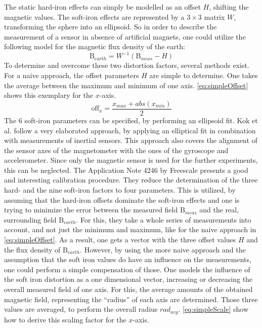 The static hard-iron effects can simply be modelled as an offset $ H $, shifting the magnetic values. The soft-iron effects are represented by a $ 3\times3 $ matrix $ W $, transforming the sphere into an ellipsoid. So in order to describe the measurement of a sensor in absence of artificial magnets, one could utilize the following model for the magnetic flux density of the earth:
\begin{equation} \label{eq:hardSoftModel}
\mathrm{B}_{earth} = W^{-1} (\mathrm{B}_{meas} - H)
\end{equation}
To determine and overcome these two distortion factors, several methods exist. For a naive approach, the offset parameters $ H $ are simple to determine. One takes the average between the maximum and minimum of one axis. \ref{eq:simpleOffset} shows this exemplary for the $ x $-axis.
\begin{equation} \label{eq:simpleOffset}
\mathrm{off}_{x} = \frac{x_{max} + abs(x_{min})}{2}
\end{equation}
The 6 soft-iron parameters can be specified, by performing an ellipsoid fit. Kok et al. \cite{kok2012calibration} follow a very elaborated approach, by applying an elliptical fit in combination with measurements of inertial sensors. This approach also covers the alignment of the sensor axes of the magnetometer with the ones of the gyroscope and accelerometer. Since only the magnetic sensor is used for the further experiments, this can be neglected. The Application Note 4246 by Freescale \cite{ozyagcilar2012calibrating} presents a good and interesting calibration procedure. They reduce the determination of the three hard- and the nine soft-iron factors to four parameters. This is utilized, by assuming that the hard-iron offsets dominate the soft-iron effects and one is trying to minimize the error between the measured field $ \mathrm{B}_{meas} $ and the real, surrounding field $ \mathrm{B}_{earth} $. For this, they take a whole series of measurements into account, and not just the minimum and maximum, like for the naive approach in \ref{eq:simpleOffset}. As a result, one gets a vector with the three offset values $ H $ and the flux density of $ \mathrm{B}_{earth} $. However, by using the more naive approach and the assumption that the soft iron values do have an influence on the measurements, one could perform a simple compensation of those. One models the influence of the soft iron distortion as a one dimensional vector, increasing or decreasing the overall measured field of one axis. For this, the average amounts of the obtained magnetic field, representing the  ``radius'' of each axis are determined. Those three values are averaged, to perform the overall radius $ rad_{avg} $. \ref{eq:simpleScale} show how to derive this scaling factor for the $ x $-axis.
